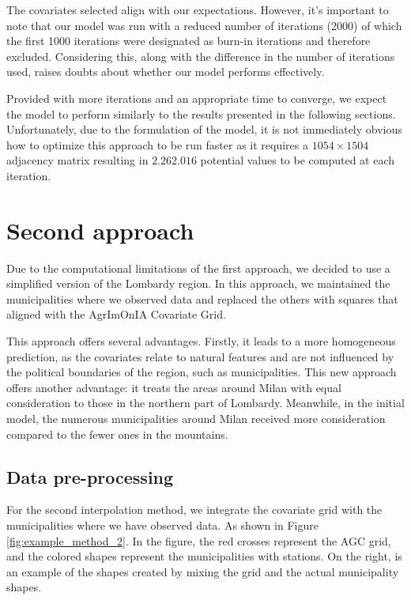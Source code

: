 \documentclass[11pt,a4paper]{article}
\begin{document}
The covariates selected align with our expectations. However, it's important to note that our model was run with a reduced number of iterations (2000) of which the first 1000 iterations were designated as burn-in iterations and therefore excluded. Considering this, along with the difference in the number of iterations used, raises doubts about whether our model performs effectively.


Provided with more iterations and an appropriate time to converge, we expect the model to perform similarly to the results presented in the following sections. Unfortunately, due to the formulation of the model, it is not immediately obvious how to optimize this approach to be run faster as it requires a $1054 \times 1504$ adjacency matrix resulting in $2.262.016$ potential values to be computed at each iteration.


\section{Second approach}
\label{sec:second_approach}
Due to the computational limitations of the first approach, we decided to use a simplified version of the Lombardy region. In this approach, we maintained the municipalities where we observed data and replaced the others with squares that aligned with the AgrImOnIA Covariate Grid.

This approach offers several advantages. Firstly, it leads to a more homogeneous prediction, as the covariates relate to natural features and are not influenced by the political boundaries of the region, such as municipalities. This new approach offers another advantage: it treats the areas around Milan with equal consideration to those in the northern part of Lombardy. Meanwhile, in the initial model, the numerous municipalities around Milan received more consideration compared to the fewer ones in the mountains.

\subsection{Data pre-processing}
\label{Second_Approach_Data_prep}

For the second interpolation method, we integrate the covariate grid with the municipalities where we have observed data. As shown in Figure \ref{fig:example_method_2}. In the figure, the red crosses represent the AGC grid, and the colored shapes represent the municipalities with stations. On the right, is an example of the shapes created by mixing the grid and the actual municipality shapes.
\end{document}
